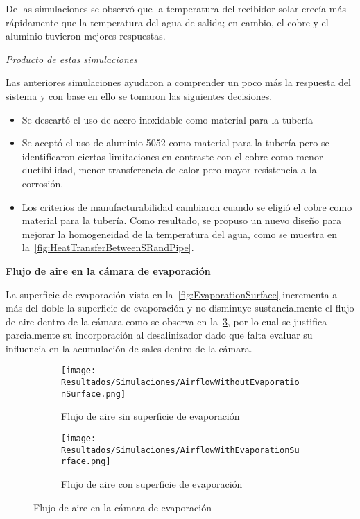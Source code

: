 				De las simulaciones se observó que la temperatura del recibidor solar crecía más rápidamente que la temperatura del agua de salida; en cambio, el cobre y el aluminio tuvieron mejores respuestas.
				
				\textit{Producto de estas simulaciones}
				
				Las anteriores simulaciones ayudaron a comprender un poco más la respuesta del sistema y con base en ello se tomaron las siguientes decisiones.
				
				\begin{itemize}
					\item Se descartó el uso de acero inoxidable como material para la tubería
					\item Se aceptó el uso de aluminio 5052 como material para la tubería pero se identificaron ciertas limitaciones en contraste con el cobre como menor ductibilidad, menor transferencia de calor pero mayor resistencia a la corrosión.
					\item Los criterios de manufacturabilidad cambiaron cuando se eligió el cobre como material para la tubería. Como resultado, se propuso un nuevo diseño para mejorar la homogeneidad de la temperatura del agua, como se muestra en la~\cref{fig:HeatTransferBetweenSRandPipe}.
				\end{itemize}
				
				
				\textbf{Flujo de aire en la cámara de evaporación}\par
			
				La superficie de evaporación vista en la~\cref{fig:EvaporationSurface} incrementa a más del doble la superficie de evaporación y no disminuye sustancialmente el flujo de aire dentro de la cámara como se observa en la~\cref{fig:AirflowInEvaporationChamber}, por lo cual se justifica parcialmente su incorporación al desalinizador dado que falta evaluar su influencia en la acumulación de sales dentro de la cámara.
				
				\begin{figure}[H]
					\centering
					\begin{subfigure}[t]{0.45\linewidth}
						\centering
						\texttt{[image: Resultados/Simulaciones/AirflowWithoutEvaporationSurface.png]}
						\caption{Flujo de aire sin superficie de evaporación}
						\label{fig:AirflowWithoutEvaporationSurface}
					\end{subfigure}
					\hfill
					\begin{subfigure}[t]{0.45\linewidth}
						\centering
						\texttt{[image: Resultados/Simulaciones/AirflowWithEvaporationSurface.png]}
						\caption{Flujo de aire con superficie de evaporación}
						\label{fig:AirflowWithEvaporationSurface}
					\end{subfigure}
					\caption{Flujo de aire en la cámara de evaporación}
					\label{fig:AirflowInEvaporationChamber}
				\end{figure}
		
